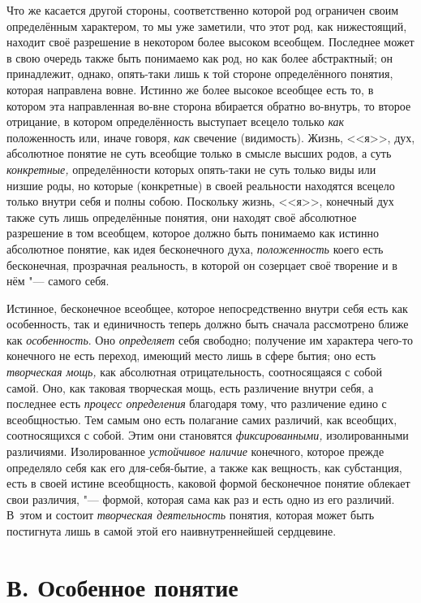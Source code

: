 Что же касается другой стороны, соответственно которой род
ограничен своим определённым характером, то мы уже заметили, что
этот род, как нижестоящий, находит своё разрешение в
некотором более высоком всеобщем. Последнее может в свою очередь также быть
понимаемо как род, но как более абстрактный; он принадлежит, однако,
опять-таки лишь к той стороне определённого понятия, которая направлена
вовне. Истинно же более высокое всеобщее есть то, в котором эта
направленная во-вне сторона вбирается обратно во-внутрь, то второе
отрицание, в котором определённость выступает всецело только
{\em как} положенность
или, иначе говоря, {\em как}
свечение (видимость). Жизнь, <<я>>, дух, абсолютное понятие не
суть всеобщие только в смысле высших родов, а суть
{\em конкретные,}
определённости которых опять-таки не суть только виды или
низшие роды, но которые (конкретные) в своей реальности находятся всецело
только внутри себя и полны собою. Поскольку жизнь, <<я>>, конечный дух также
суть лишь определённые понятия, они находят своё абсолютное разрешение в
том всеобщем, которое должно быть понимаемо как истинно абсолютное понятие,
как идея бесконечного духа,
{\em положенность} коего
есть бесконечная, прозрачная реальность, в которой он созерцает своё
творение и в нём "--- самого себя.

Истинное, бесконечное всеобщее, которое непосредственно внутри
себя есть как особенность, так и единичность теперь должно быть сначала
рассмотрено ближе как
{\em особенность}. Оно
{\em определяет} себя
свободно; получение им характера чего-то конечного не есть переход, имеющий
место лишь в сфере бытия; оно есть
{\em творческая мощь,}
как абсолютная отрицательность, соотносящаяся с собой самой.
Оно, как таковая творческая мощь, есть различение внутри себя, а последнее
есть {\em процесс определения}
благодаря тому, что различение едино с всеобщностью. Тем
самым оно есть полагание самих различий, как всеобщих, соотносящихся с
собой. Этим они становятся
{\em фиксированными,}
изолированными различиями. Изолированное
{\em устойчивое наличие}
конечного, которое прежде определяло себя как его
для-себя-бытие, а также как вещность, как субстанция, есть в своей истине
всеобщность, каковой формой бесконечное понятие облекает свои различия, "---
формой, которая сама как раз и есть одно из его различий.
В~этом и состоит {\em творческая
деятельность} понятия, которая может быть постигнута лишь в
самой этой его наивнутреннейшей сердцевине.

\section[В. Особенное понятие]{В. Особенное понятие}

